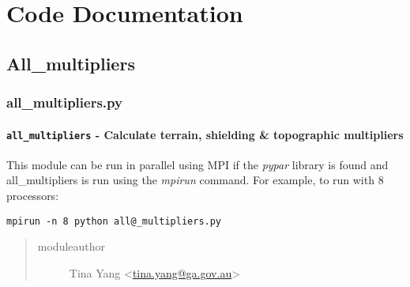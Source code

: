 \documentclass[letterpaper,10pt,english]{sphinxmanual}
\begin{document}
\chapter{Code Documentation}
\label{index:code-documentation}

\section{All\_multipliers}
\label{docs/all_multipliers:all-multipliers}\label{docs/all_multipliers::doc}

\subsection{all\_multipliers.py}
\label{docs/all_multipliers:module-all_multipliers}\label{docs/all_multipliers:all-multipliers-py}

\subsubsection{\texttt{all\_multipliers} - Calculate terrain, shielding \& topographic multipliers}
\label{docs/all_multipliers:all-multipliers-calculate-terrain-shielding-topographic-multipliers}
This module can be run in parallel using MPI if the
\emph{pypar} library is found and all\_multipliers is run using the
\emph{mpirun} command. For example, to run with 8 processors:

\begin{Verbatim}[commandchars=@\[\]]
mpirun -n 8 python all@_multipliers.py
\end{Verbatim}
\begin{quote}\begin{description}
\item[{moduleauthor}] \leavevmode
Tina Yang \textless{}\href{mailto:tina.yang@ga.gov.au}{tina.yang@ga.gov.au}\textgreater{}

\end{description}\end{quote}

\end{document}

